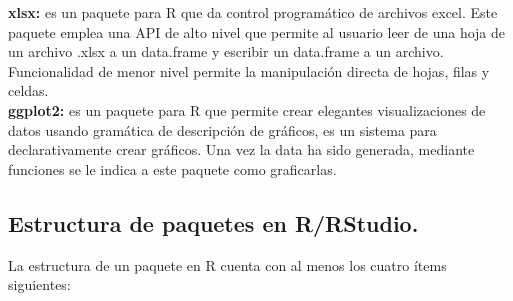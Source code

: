 \textbf{ xlsx:} es un paquete para R que da control programático de archivos excel. Este paquete emplea una API de alto nivel que permite al usuario leer de una hoja de un archivo .xlsx a un data.frame y escribir un data.frame a un archivo. Funcionalidad de menor nivel permite la manipulación directa de hojas, filas y celdas.\\

\textbf{ggplot2:} es un paquete para R que permite crear elegantes visualizaciones de datos usando gramática de descripción de gráficos, es un sistema para declarativamente crear gráficos. Una vez la data ha sido generada, mediante funciones se le indica a este paquete como graficarlas.\\

\subsection{Estructura de paquetes en R/RStudio.}

La estructura de un paquete en R cuenta con al menos los cuatro \'items siguientes:

